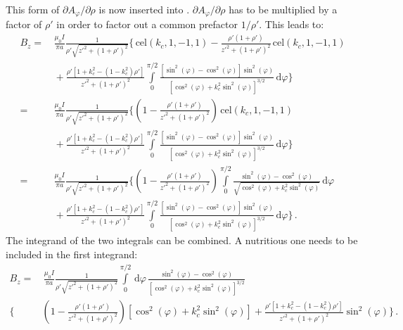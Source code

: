 This form of $\partial A_\varphi / \partial \rho$ is now inserted into .
$\partial A_\varphi / \partial \rho$ has to be multiplied by a factor of $\rho'$ in order to factor out a common prefactor $1/\rho'$.
This leads to:
\begin{align}
  B_z
 =&\, \frac{\mu_0 I}{\pi a}
      \frac{1}{\rho' \sqrt{z'^2 + (1 + \rho')^2}} \Biggl\{ \,\mathrm{cel}(k_c, 1, -1, 1) - \frac{\rho' (1+\rho')}{z'^2 + (1 + \rho')^2} \,\mathrm{cel}(k_c, 1, -1, 1) \nonumber \\
 ~&\, + \frac{\rho' \left[1 + k_c^2 - (1 - k_c^2) \rho'\right]}{z'^2 + (1 + \rho')^2}
          \int\limits_0^{\pi/2}
          \frac{\left[\sin^2(\varphi) - \cos^2(\varphi) \right] \sin^2(\varphi)}
               {\left[\cos^2(\varphi) + k_c^2 \sin^2(\varphi) \right]^{3/2}}  \,\mathrm{d}\varphi \Biggr\} \nonumber \\
 =&\, \frac{\mu_0 I}{\pi a}
      \frac{1}{\rho' \sqrt{z'^2 + (1 + \rho')^2}} \Biggl\{ \left( 1 - \frac{\rho' (1+\rho')}{z'^2 + (1 + \rho')^2}\right) \,\mathrm{cel}(k_c, 1, -1, 1) \nonumber \\
 ~&\, + \frac{\rho' \left[1 + k_c^2 - (1 - k_c^2) \rho'\right]}{z'^2 + (1 + \rho')^2}
          \int\limits_0^{\pi/2}
          \frac{\left[\sin^2(\varphi) - \cos^2(\varphi) \right] \sin^2(\varphi)}
               {\left[\cos^2(\varphi) + k_c^2 \sin^2(\varphi) \right]^{3/2}}  \,\mathrm{d}\varphi \Biggr\} \nonumber \\
 =&\, \frac{\mu_0 I}{\pi a}
      \frac{1}{\rho' \sqrt{z'^2 + (1 + \rho')^2}} \Biggl\{ \left( 1 - \frac{\rho' (1+\rho')}{z'^2 + (1 + \rho')^2}\right)
      \int\limits_0^{\pi/2}
        \frac{\sin^2(\varphi) - \cos^2(\varphi)}
             {\sqrt{\cos^2(\varphi) + k_c^2 \sin^2(\varphi)}} \,\mathrm{d}\varphi \nonumber \\
 ~&\, + \frac{\rho' \left[1 + k_c^2 - (1 - k_c^2) \rho'\right]}{z'^2 + (1 + \rho')^2}
          \int\limits_0^{\pi/2}
          \frac{\left[\sin^2(\varphi) - \cos^2(\varphi) \right] \sin^2(\varphi)}
               {\left[\cos^2(\varphi) + k_c^2 \sin^2(\varphi) \right]^{3/2}}  \,\mathrm{d}\varphi \Biggr\} \, .
\end{align}
The integrand of the two integrals can be combined.
A nutritious one needs to be included in the first integrand:
\begin{align}
  B_z
 =&\, \frac{\mu_0 I}{\pi a}
      \frac{1}{\rho' \sqrt{z'^2 + (1 + \rho')^2}}
      \int\limits_0^{\pi/2} \,\mathrm{d}\varphi\,
        \frac{\sin^2(\varphi) - \cos^2(\varphi)}
             {\left[\cos^2(\varphi) + k_c^2 \sin^2(\varphi) \right]^{3/2}} \nonumber \\
 \Biggl\{ &\left( 1 - \frac{\rho' (1+\rho')}{z'^2 + (1 + \rho')^2} \right)
            \left[ \cos^2(\varphi) + k_c^2 \sin^2(\varphi) \right]
          + \frac{\rho' \left[1 + k_c^2 - (1 - k_c^2) \rho'\right]}{z'^2 + (1 + \rho')^2} \sin^2(\varphi)
        \Biggr\} \, .
\end{align}

